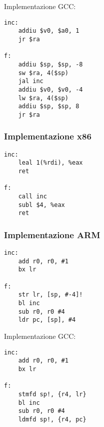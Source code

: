 \documentclass[class=book, crop=false, oneside]{standalone}
\begin{document}
Implementazione GCC:
\begin{verbatim}
inc:
	addiu $v0, $a0, 1
	jr $ra

f:
	addiu $sp, $sp, -8
	sw $ra, 4($sp)
	jal inc
	addiu $v0, $v0, -4
	lw $ra, 4($sp)
	addiu $sp, $sp, 8
	jr $ra
\end{verbatim}

\subsubsection*{Implementazione x86}
\begin{verbatim}
inc:
	leal 1(%rdi), %eax
	ret

f:
	call inc
	subl $4, %eax
	ret
\end{verbatim}

\subsubsection*{Implementazione ARM}
\begin{verbatim}
inc:
	add r0, r0, #1
	bx lr

f:
	str lr, [sp, #-4]!
	bl inc
	sub r0, r0 #4
	ldr pc, [sp], #4
\end{verbatim}

Implementazione GCC:
\begin{verbatim}
inc:
	add r0, r0, #1
	bx lr

f:
	stmfd sp!, {r4, lr}
	bl inc
	sub r0, r0 #4
	ldmfd sp!, {r4, pc}
\end{verbatim}
\end{document}

